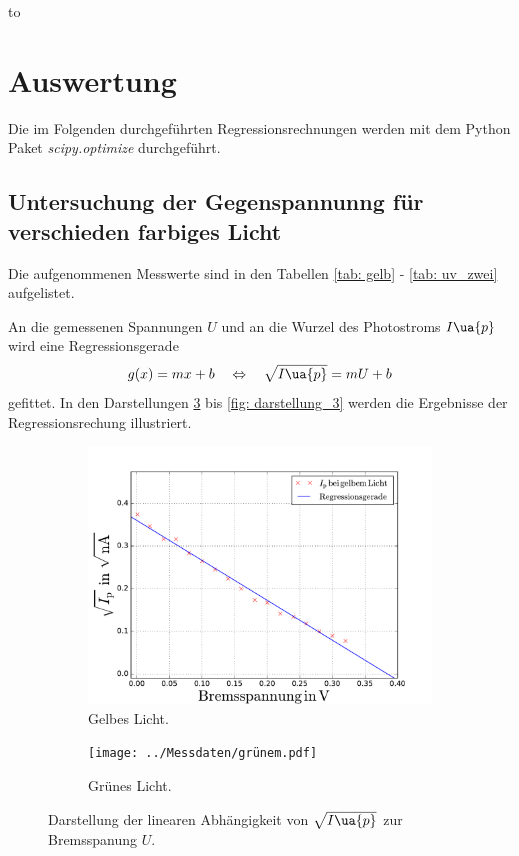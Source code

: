 to\section{Auswertung}

Die im Folgenden durchgeführten Regressionsrechnungen werden mit dem
Python Paket \emph{scipy.optimize}\cite{scipy} durchgeführt. %

\subsection{Untersuchung der Gegenspannunng für verschieden farbiges Licht}
\FloatBarrier
Die aufgenommenen Messwerte sind in den Tabellen \ref{tab: gelb} - \ref{tab: uv_zwei} aufgelistet.






An die gemessenen Spannungen $U$ und an die Wurzel des Photostroms $I\ua{p}$ wird eine
Regressionsgerade
\begin{equation}
  \label{eq:reg} %
  g(x)=mx+b \quad \Leftrightarrow \quad \sqrt{I\ua{p}}=mU+b
\end{equation}
gefittet.
In den Darstellungen \ref{fig: darstellung_1} bis \ref{fig: darstellung_3} werden die Ergebnisse der Regressionsrechung
illustriert.
\begin{figure}
  \centering
  \begin{subfigure}{0.48\textwidth}
    \centering
    \includegraphics[width=1 \textwidth]{../Messdaten/gelbem.pdf}
    \caption{Gelbes Licht.}
    \label{fig: gelb}
  \end{subfigure}
  \begin{subfigure}{0.48\textwidth}
    \centering
    \texttt{[image: ../Messdaten/grünem.pdf]}
    \caption{Grünes Licht.}
    \label{fig: grün}
  \end{subfigure}
  \caption{Darstellung der linearen Abhängigkeit von $\sqrt{I\ua{p}}$ zur Bremsspanung $U$.}
  \label{fig: darstellung_1}
\end{figure}
